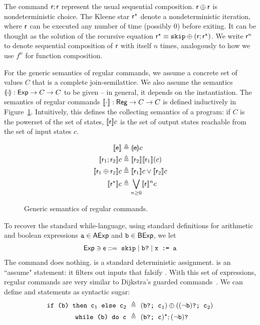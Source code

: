 The command $\mathsf{r}; \mathsf{r}$ represent the usual sequential composition. $\mathsf{r} \oplus \mathsf{r}$ is nondeterministic choice. The Kleene star $\mathsf{r}^\star$ denote a nondeterministic iteration, where $\mathsf{r}$ can be executed any number of time (possibly 0) before exiting. It can be thought as the solution of the recursive equation $\mathsf{r}^\star \equiv \texttt{skip} \oplus (\mathsf{r}; \mathsf{r}^{\star})$.
We write $\mathsf{r}^n$ to denote sequential composition of $\mathsf{r}$ with itself $n$ times, analogously to how we use $f^n$ for function composition.

For the generic semantics of regular commands, we assume a concrete set of values $C$ that is a complete join-semilattice. We also assume the semantics $\llparenthesis\cdot\rrparenthesis : \mathsf{Exp} \rightarrow C \rightarrow C$ to be given -- in general, it depends on the instantiation.
The semantics of regular commands $\llbracket\cdot\rrbracket : \mathsf{Reg} \rightarrow C \rightarrow C$ is defined inductively in Figure~\ref{fig:bg:regcom-sem}. Intuitively, this defines the collecting semantics of a program: if $C$ is the powerset of the set of states, $\llbracket\mathsf{r}\rrbracket c$ is the set of output states reachable from the set of input states $c$.
\begin{figure}[t]
	\begin{align*}
		\llbracket\mathsf{e}\rrbracket                      & \triangleq \llparenthesis\mathsf{e}\rrparenthesis c                       \\
		\llbracket\mathsf{r}_1 ; \mathsf{r}_2 \rrbracket c       & \triangleq \llbracket\mathsf{r}_2\rrbracket\llbracket\mathsf{r}_1\rrbracket (c)     \\
		\llbracket\mathsf{r}_1 \oplus \mathsf{r}_2\rrbracket c & \triangleq \llbracket\mathsf{r}_1\rrbracket c \vee \llbracket\mathsf{r}_2\rrbracket c \\
		\llbracket\mathsf{r}^\star\rrbracket c              & \triangleq \bigvee_{n \ge 0} \llbracket\mathsf{r}\rrbracket^n c
	\end{align*}
	\caption{Generic semantics of regular commands.}
	\label{fig:bg:regcom-sem}
\end{figure}

To recover the standard while-language, using standard definitions for arithmetic and boolean expressions $\texttt{a} \in \mathsf{AExp}$ and $\texttt{b} \in \mathsf{BExp}$, we let
\begin{align*}
	\mathsf{Exp} \ni \mathsf{e} ::= \; \texttt{skip} \mid \texttt{b?} \mid \texttt{x := a}
\end{align*}
The command  does nothing.  is a standard deterministic assignment.  is an ``assume" statement: it filters out inputs that falsify .
With this set of expressions, regular commands are very similar to Dijkstra's guarded commands~\cite{Dijkstra75}.
We can define  and  statements as syntactic sugar:
\begin{align*}
	\code{if (b) then } \code{c}_1 \code{ else } \code{c}_2 & \ \eqdef\  (\code{b?; c}_1) \regplus ((\lnot \code{b})\code{?; c}_2) \\
	\code{while (b) do c}                                   & \ \eqdef\  (\code{b?; c})^\kstar; (\lnot \code{b})\code{?}
\end{align*}

